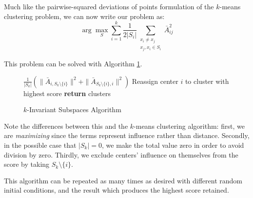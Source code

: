 Much like the pairwise-squared deviations of points formulation of the $k$-means clustering problem, we can now write our problem as:
$$\arg\max_S \sum_{i=1}^k \frac{1}{2|S_i|} \sum_{\substack{x_i \neq x_j \\ x_j,x_i\in S_i}} \bar A_{ij}^2 $$

This problem can be solved with Algorithm \ref{kinvsub}.

\begin{figure}[t!]
	\begin{algorithm}[H]
		\caption{$k$-Invariant Subspaces Algorithm}
		\label{kinvsub}
		\begin{algorithmic}
				 $ \frac{1}{|S_k|} \left( \|\bar A_{i, S_k\setminus \{i\} } \|^2 + \|\bar A_{S_k\setminus \{i\},i} \|^2 \right)$
				\STATE Reassign center $i$ to cluster with highest score
				\ENDFOR
				\ENDWHILE   
				\STATE \textbf{return} clusters
		\end{algorithmic}
	\end{algorithm}
	\vspace{-0.2in}
\end{figure}



Note the differences between this and the $k$-means clustering algorithm: first, we are \emph{maximizing} since the terms represent influence rather than distance. Secondly, in the possible case that $|S_k|=0$, we make the total value zero in order to avoid division by zero. Thirdly, we exclude centers' influence on themselves from the score by taking $S_k\setminus\{i\}$.

This algorithm can be repeated as many times as desired with different random initial conditions, and the result which produces the highest score retained.
